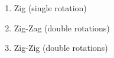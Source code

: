 \documentclass[12pt]{article}
\begin{document}
\begin{enumerate}
    \item \begin{minipage}[t]{\linewidth}
              \raggedright
              \medskip

              Zig (single rotation)
        \end{minipage}
    \item \begin{minipage}[t]{\linewidth}
              \raggedright
              \medskip

              Zig-Zag (double rotations)
        \end{minipage}
    \item \begin{minipage}[t]{\linewidth}
              \raggedright
              \medskip
              
              Zig-Zig (double rotations)
        \end{minipage}
\end{enumerate}
\end{document}

